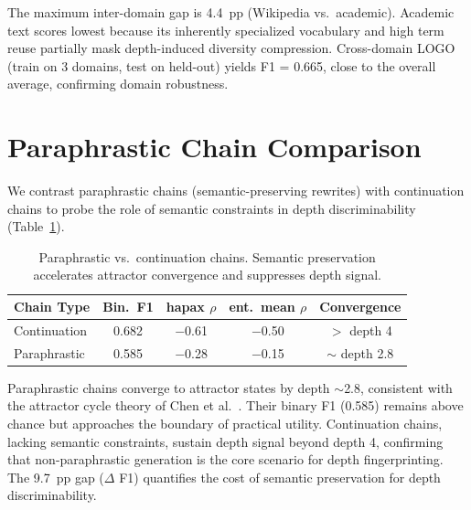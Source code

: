 \documentclass[11pt,a4paper]{article}
\begin{document}
The maximum inter-domain gap is 4.4~pp (Wikipedia vs.\ academic).
Academic text scores lowest because its inherently specialized vocabulary and high term reuse partially mask depth-induced diversity compression.
Cross-domain LOGO (train on 3 domains, test on held-out) yields F1 = 0.665, close to the overall average, confirming domain robustness.

\section{Paraphrastic Chain Comparison}
\label{app:paraphrastic}

We contrast paraphrastic chains (semantic-preserving rewrites) with continuation chains to probe the role of semantic constraints in depth discriminability (Table~\ref{tab:para}).

\begin{table}[h]
\centering
\small
\caption{Paraphrastic vs.\ continuation chains. Semantic preservation accelerates attractor convergence and suppresses depth signal.}
\label{tab:para}
\begin{tabular}{lcccc}
\toprule
\textbf{Chain Type} & \textbf{Bin.\ F1} & \textbf{hapax $\rho$} & \textbf{ent.\ mean $\rho$} & \textbf{Convergence} \\
\midrule
Continuation & 0.682 & $-$0.61 & $-$0.50 & $>$ depth 4 \\
Paraphrastic & 0.585 & $-$0.28 & $-$0.15 & $\sim$ depth 2.8 \\
\bottomrule
\end{tabular}
\end{table}

Paraphrastic chains converge to attractor states by depth $\sim$2.8, consistent with the attractor cycle theory of Chen et al.\ \cite{chen2025llm}.
Their binary F1 (0.585) remains above chance but approaches the boundary of practical utility.
Continuation chains, lacking semantic constraints, sustain depth signal beyond depth 4, confirming that non-paraphrastic generation is the core scenario for depth fingerprinting.
The 9.7~pp gap ($\Delta$ F1) quantifies the cost of semantic preservation for depth discriminability.
\end{document}
